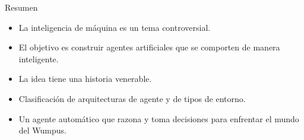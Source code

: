 \documentclass[11pt]{beamer}
\begin{document}
\begin{frame}{Resumen}

\begin{itemize}
\item La inteligencia de máquina es un tema controversial.
\item El objetivo es construir agentes artificiales que se comporten de manera inteligente.
\item La idea tiene una historia venerable.
\item Clasificación de arquitecturas de agente y de tipos de entorno.
\item Un agente automático que razona y toma decisiones para enfrentar el mundo del Wumpus.
\end{itemize}

\end{frame}
\end{document}
